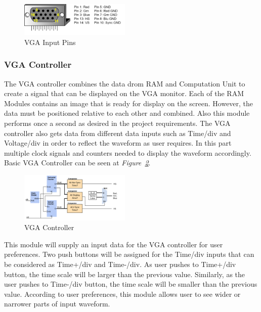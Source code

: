 \documentclass[paper]{IEEEtran}
\begin{document}
\begin{figure}[h!]
			\setlength{\unitlength}{\textwidth}
			\center 
			\includegraphics[width=0.47\textwidth]{vga_pins}
			\caption{\label{fig:vga_pins} VGA Input Pins}
\end{figure}

\subsubsection{VGA Controller} \- \indent

	The VGA controller combines the data drom RAM and Computation Unit to create a signal that can be displayed on the VGA monitor. Each of the RAM Modules contains an image that is ready for display on the screen. However, the data must be positioned relative to each other and combined. Also this module performs once a second as desired in the project requirements. The VGA controller also gets data from different data inputs such as Time/div and Voltage/div in order to reflect the waveform as user requires. In this part multiple clock signals and counters needed to display the waveform accordingly. Basic VGA Controller can be seen at \textit{Figure~\ref{fig:vga_controller}}\cite{b4}.

\begin{figure}[h!]
			\setlength{\unitlength}{\textwidth}
			\center 
			\includegraphics[width=0.47\textwidth]{vga_controller}
			\caption{\label{fig:vga_controller} VGA Controller}
\end{figure}
		
			
	This module will supply an input data for the VGA controller for user preferences. Two push buttons will be assigned for the Time/div inputs that can be considered as Time+/div and Time-/div. As user pushes to Time+/div button, the time scale will be larger than the previous value. Similarly, as the user pushes to Time-/div button, the time scale will be smaller than the previous value. According to user preferences, this module allows user to see wider or narrower parts of input waveform.
\end{document}
